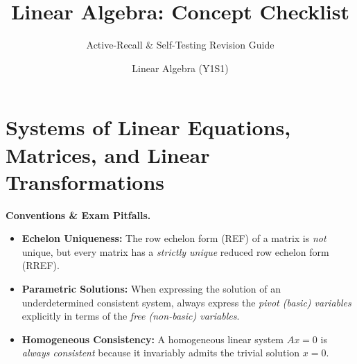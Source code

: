 \documentclass{natsirt}
\title{Linear Algebra: Concept Checklist}
\author{Linear Algebra (Y1S1)}
\subtitle{Active-Recall \& Self-Testing Revision Guide}
\newenvironment{warningbox}[1][]{\begin{whitebox}[#1]\textbf{Conventions \& Exam Pitfalls. }}{\end{whitebox}}
\newcommand{\citem}{\item[$\square$]}
\begin{document}
\section{Systems of Linear Equations, Matrices, and Linear Transformations}

\begin{warningbox}
    \begin{itemize}
        \citem \textbf{Echelon Uniqueness:} The row echelon form (REF) of a matrix is \emph{not} unique, but every matrix has a \emph{strictly unique} reduced row echelon form (RREF).
        \citem \textbf{Parametric Solutions:} When expressing the solution of an underdetermined consistent system, always express the \emph{pivot (basic) variables} explicitly in terms of the \emph{free (non-basic) variables}.
        \citem \textbf{Homogeneous Consistency:} A homogeneous linear system $Ax = 0$ is \emph{always consistent} because it invariably admits the trivial solution $x = 0$.
    \end{itemize}
\end{warningbox}
\end{document}
